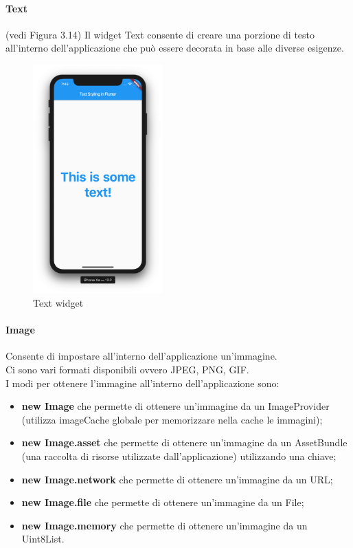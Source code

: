 \paragraph{Text} (vedi Figura 3.14)
Il widget Text consente di creare una porzione di testo all'interno dell'applicazione che può essere decorata in base alle diverse esigenze.
\begin{figure}[htbp]	
	\centering
	\includegraphics[width=5cm]{immagini/text.png}
	\caption{Text widget}
	\label{fig:Text widget}
\end{figure}

\paragraph{Image}
Consente di impostare all'interno dell'applicazione un'immagine.\\
Ci sono vari formati disponibili ovvero JPEG, PNG, GIF.\\
I modi per ottenere l'immagine all'interno dell'applicazione sono:
\begin{itemize}
	\item \textbf{new Image} che permette di ottenere un'immagine da un  ImageProvider (utilizza imageCache globale per memorizzare nella cache le immagini);   
	\item \textbf{new Image.asset} che permette di ottenere un'immagine da un AssetBundle (una raccolta di risorse utilizzate dall'applicazione) utilizzando una chiave;
	\item \textbf{new Image.network} che permette di ottenere un'immagine da un URL;   
	\item \textbf{new Image.file} che permette di ottenere un'immagine da un File;
	\item \textbf{new Image.memory} che permette di ottenere un'immagine da un Uint8List.
\end{itemize}

